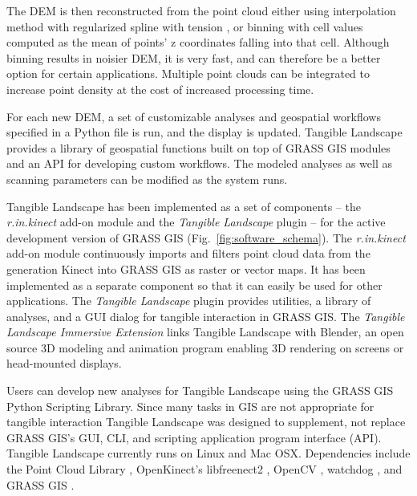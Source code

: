 \documentclass[prodmode,acmtochi]{acmsmall} %
\begin{document}
The DEM is then reconstructed from the point cloud either using interpolation method
with regularized spline with tension \cite{Mitasova2005},
or binning with cell values computed as the mean of points' z coordinates falling into that cell.
Although binning results in noisier DEM, it is very fast,
and can therefore be a better option for certain applications. 
Multiple point clouds can be integrated to increase point density at the cost of increased
processing time.

For each new DEM, a set of customizable analyses and geospatial workflows
specified in a Python file is run, and the display is updated.
Tangible Landscape provides a library of geospatial functions built on top of
GRASS GIS modules and an API for developing custom workflows.
The modeled analyses as well as scanning parameters can be modified 
as the system runs.



Tangible Landscape has been implemented as a set of components 
-- the \emph{r.in.kinect} add-on module \cite{r.in.kinect}
and the \emph{Tangible Landscape} plugin \cite{grass-tangible-landscape}
--
for the active development version of GRASS GIS (Fig.~\ref{fig:software_schema}). 
The \emph{r.in.kinect} add-on module continuously imports and filters point cloud data from the  generation Kinect into GRASS GIS as raster or vector maps. 
It has been implemented as a separate component so that it can easily be used for other applications.
The \emph{Tangible Landscape} plugin provides 
utilities, a library of analyses, and a GUI dialog for tangible interaction in GRASS GIS.
The \emph{Tangible Landscape Immersive Extension} \cite{tangible-landscape-immersive-extension}
links Tangible Landscape with Blender, 
an open source 3D modeling and animation program \cite{Blender} 
enabling 3D rendering on screens or head-mounted displays.

Users can develop new analyses for Tangible Landscape 
using the GRASS GIS Python Scripting Library.  %
Since many tasks in GIS are not appropriate for tangible interaction
Tangible Landscape was designed to supplement, 
not replace GRASS GIS's GUI, CLI, and scripting application program interface (API). 
Tangible Landscape currently runs on Linux and Mac OSX.
Dependencies include the Point Cloud Library \cite{Rusu2011,PCL}, 
OpenKinect's libfreenect2 \cite{OpenKinect}, 
OpenCV \cite{OpenCV},  
watchdog \cite{watchdog}, 
and GRASS GIS \cite{GRASS_GIS_software}.
\end{document}
